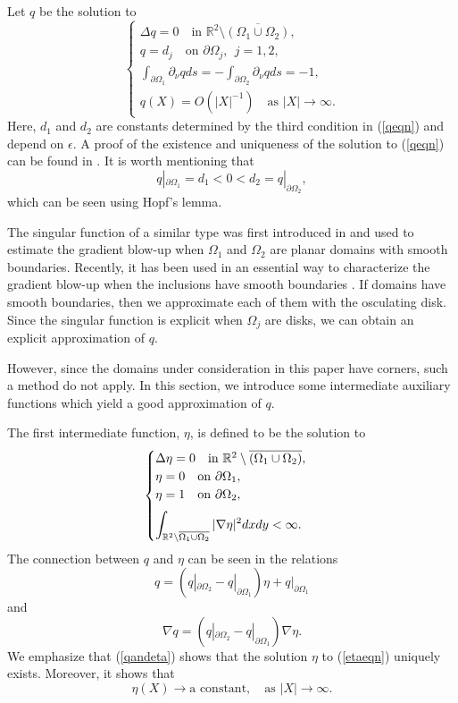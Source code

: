 \documentclass[11pt,a4paper]{article}
\numberwithin{equation}{section}
\def\nm{\noalign{\medskip}}
\newcommand{\ds}{\displaystyle}
\newcommand{\p}{\partial}
\newcommand{\eqnref}[1]{(\ref {#1})}
\newcommand{\Rbb}{\mathbb{R}}
\newcommand{\Ge}{\epsilon}
\newcommand{\Gn}{\eta}
\newcommand{\GD}{\Delta}
\newcommand{\GO}{\Omega}
\newcommand{\beq}{\begin{equation}}
\newcommand{\eeq}{\end{equation}}
\begin{document}
Let $q$ be the solution to
\beq\label{qeqn}
\begin{cases}
\GD q = 0 \quad\mbox{in }  \Rbb^2 \setminus \overline {(\GO_{1} \cup \GO_{2})}, \\
\ds q = {d}_j  \quad\mbox{on } \p \GO_{j}, \ \ j=1,2, \\
\ds \int_{\p \GO_{1}} \p_{\nu} q ds = -\ds \int_{\p \GO_{2}} \p_{\nu} q ds =-1, \\
\ds q (X)  = O(|X|^{-1}) \quad\mbox{as } |X| \rightarrow \infty  .
\end{cases}
\eeq
Here, $d_1$ and $d_2$ are constants determined by the third condition in \eqnref{qeqn} and depend on $\Ge$. A proof of the existence and uniqueness of the solution to \eqnref{qeqn} can be found in \cite{ACKLY-ARMA-13}. It is worth mentioning that
\beq
q|_{\p \GO_1} = d_1 < 0 < d_2 = q |_{\p \GO_2} ,
\eeq
which can be seen using Hopf's lemma.

The singular function of a similar type was first introduced in \cite{Y} and used to estimate the gradient blow-up when $\GO_1$ and $\GO_2$ are planar domains with smooth boundaries. Recently, it has been used in an essential way to characterize the gradient blow-up when the inclusions have smooth boundaries \cite{ACKLY-ARMA-13, KLY-MA-15}. If domains have smooth boundaries, then we approximate each of them with the osculating disk. Since the singular function is explicit when $\GO_j$ are disks, we can obtain an explicit approximation of $q$.

However, since the domains under consideration in this paper have corners, such a method do not apply. In this section, we introduce some intermediate auxiliary functions which yield a good approximation of $q$.

The first intermediate function, $\Gn$, is defined to be the solution to
\beq\label{etaeqn}
\begin{cases}
\GD \Gn = 0 \quad\mbox{in }  \Rbb^2 \setminus \overline {\left(\GO_{1} \cup \GO_{2}\right)}, \\
\Gn = 0  \quad \mbox{on }\p \GO_{1},  \\
\Gn = 1    \quad \mbox{on } \p \GO_{2}  ,\\
\nm
\ds \int_{\Rbb^2 \setminus \overline {\GO_{1}\cup \GO_2}} |\nabla \Gn|^2 dxdy < \infty .  \end{cases}
\eeq
The connection between $q$ and $\Gn$ can be seen in the relations
\beq\label{qandeta}
q = (q |_{\p\GO_2} - q|_{\p\GO_1}) \Gn + q|_{\p \GO_1}
\eeq
and
\beq\label{q_and_Q}
\nabla q =  (q |_{\p\GO_2} - q|_{\p\GO_1}) \nabla \Gn.
\eeq
We emphasize that \eqnref{qandeta} shows that the solution $\eta$ to \eqnref{etaeqn} uniquely exists. Moreover, it shows that 
\beq\label{etainf}
\eta(X) \to \text{a constant}, \quad \text{as } |X| \to \infty.
\eeq
\end{document}
